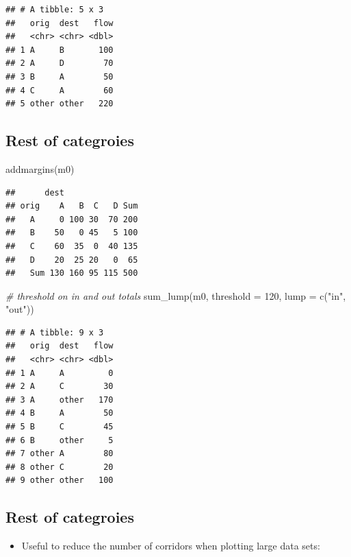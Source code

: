 \documentclass[
]{book}
\newenvironment{Shaded}{\begin{snugshade}}{\end{snugshade}}
\newcommand{\AttributeTok}[1]{\textcolor[rgb]{0.77,0.63,0.00}{#1}}
\newcommand{\CommentTok}[1]{\textcolor[rgb]{0.56,0.35,0.01}{\textit{#1}}}
\newcommand{\DecValTok}[1]{\textcolor[rgb]{0.00,0.00,0.81}{#1}}
\newcommand{\FunctionTok}[1]{\textcolor[rgb]{0.00,0.00,0.00}{#1}}
\newcommand{\NormalTok}[1]{#1}
\newcommand{\StringTok}[1]{\textcolor[rgb]{0.31,0.60,0.02}{#1}}
\providecommand{\tightlist}{%
  \setlength{\itemsep}{0pt}\setlength{\parskip}{0pt}}
\begin{document}
\begin{verbatim}
## # A tibble: 5 x 3
##   orig  dest   flow
##   <chr> <chr> <dbl>
## 1 A     B       100
## 2 A     D        70
## 3 B     A        50
## 4 C     A        60
## 5 other other   220
\end{verbatim}

\hypertarget{rest-of-categroies-1}{%
\subsection{Rest of categroies}\label{rest-of-categroies-1}}

\begin{Shaded}
\begin{Highlighting}[]
\FunctionTok{addmargins}\NormalTok{(m0)}
\end{Highlighting}
\end{Shaded}

\begin{verbatim}
##      dest
## orig    A   B  C   D Sum
##   A     0 100 30  70 200
##   B    50   0 45   5 100
##   C    60  35  0  40 135
##   D    20  25 20   0  65
##   Sum 130 160 95 115 500
\end{verbatim}

\begin{Shaded}
\begin{Highlighting}[]
\CommentTok{\# threshold on in and out totals}
\FunctionTok{sum\_lump}\NormalTok{(m0, }\AttributeTok{threshold =} \DecValTok{120}\NormalTok{, }\AttributeTok{lump =} \FunctionTok{c}\NormalTok{(}\StringTok{"in"}\NormalTok{, }\StringTok{"out"}\NormalTok{))}
\end{Highlighting}
\end{Shaded}

\begin{verbatim}
## # A tibble: 9 x 3
##   orig  dest   flow
##   <chr> <chr> <dbl>
## 1 A     A         0
## 2 A     C        30
## 3 A     other   170
## 4 B     A        50
## 5 B     C        45
## 6 B     other     5
## 7 other A        80
## 8 other C        20
## 9 other other   100
\end{verbatim}

\hypertarget{rest-of-categroies-2}{%
\subsection{Rest of categroies}\label{rest-of-categroies-2}}

\begin{itemize}
\tightlist
\item
  Useful to reduce the number of corridors when plotting large data sets:
\end{itemize}
\end{document}
